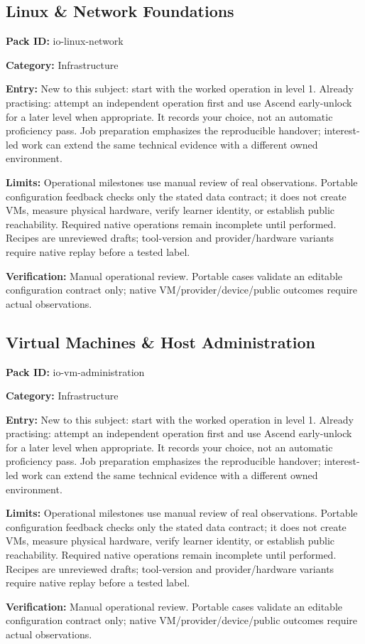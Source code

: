 \subsection{Linux \& Network Foundations}
\noindent\textbf{Pack ID:} io-linux-network\par
\noindent\textbf{Category:} Infrastructure\par
\noindent\textbf{Entry:} New to this subject: start with the worked operation in level 1. Already practising: attempt an independent operation first and use Ascend early-unlock for a later level when appropriate. It records your choice, not an automatic proficiency pass. Job preparation emphasizes the reproducible handover; interest-led work can extend the same technical evidence with a different owned environment.\par
\noindent\textbf{Limits:} Operational milestones use manual review of real observations. Portable configuration feedback checks only the stated data contract; it does not create VMs, measure physical hardware, verify learner identity, or establish public reachability. Required native operations remain incomplete until performed. Recipes are unreviewed drafts; tool-version and provider/hardware variants require native replay before a tested label.\par
\noindent\textbf{Verification:} Manual operational review. Portable cases validate an editable configuration contract only; native VM/provider/device/public outcomes require actual observations.\par
\subsection{Virtual Machines \& Host Administration}
\noindent\textbf{Pack ID:} io-vm-administration\par
\noindent\textbf{Category:} Infrastructure\par
\noindent\textbf{Entry:} New to this subject: start with the worked operation in level 1. Already practising: attempt an independent operation first and use Ascend early-unlock for a later level when appropriate. It records your choice, not an automatic proficiency pass. Job preparation emphasizes the reproducible handover; interest-led work can extend the same technical evidence with a different owned environment.\par
\noindent\textbf{Limits:} Operational milestones use manual review of real observations. Portable configuration feedback checks only the stated data contract; it does not create VMs, measure physical hardware, verify learner identity, or establish public reachability. Required native operations remain incomplete until performed. Recipes are unreviewed drafts; tool-version and provider/hardware variants require native replay before a tested label.\par
\noindent\textbf{Verification:} Manual operational review. Portable cases validate an editable configuration contract only; native VM/provider/device/public outcomes require actual observations.\par
